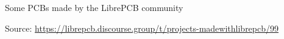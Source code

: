\begin{frame}[noframenumbering]{\secname}

  Some PCBs made by the LibrePCB community \faChild\faChild\faChild

  \begin{center}

    \tiny Source:
    \url{https://librepcb.discourse.group/t/projects-madewithlibrepcb/99}
  \end{center}

\end{frame}
